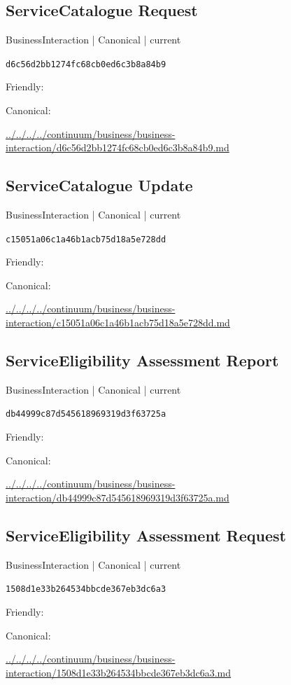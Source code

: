 \documentclass[10pt,a4paper]{article}
\begin{document}
\subsection*{ServiceCatalogue Request}
{\small BusinessInteraction | Canonical | current}\par
\texttt{d6c56d2bb1274fc68cb0ed6c3b8a84b9}\par
Friendly: \par
Canonical: \par
{\footnotesize\url{../../../../continuum/business/business-interaction/d6c56d2bb1274fc68cb0ed6c3b8a84b9.md}}\par
\subsection*{ServiceCatalogue Update}
{\small BusinessInteraction | Canonical | current}\par
\texttt{c15051a06c1a46b1acb75d18a5e728dd}\par
Friendly: \par
Canonical: \par
{\footnotesize\url{../../../../continuum/business/business-interaction/c15051a06c1a46b1acb75d18a5e728dd.md}}\par
\subsection*{ServiceEligibility Assessment Report}
{\small BusinessInteraction | Canonical | current}\par
\texttt{db44999c87d545618969319d3f63725a}\par
Friendly: \par
Canonical: \par
{\footnotesize\url{../../../../continuum/business/business-interaction/db44999c87d545618969319d3f63725a.md}}\par
\subsection*{ServiceEligibility Assessment Request}
{\small BusinessInteraction | Canonical | current}\par
\texttt{1508d1e33b264534bbcde367eb3dc6a3}\par
Friendly: \par
Canonical: \par
{\footnotesize\url{../../../../continuum/business/business-interaction/1508d1e33b264534bbcde367eb3dc6a3.md}}\par
\end{document}
